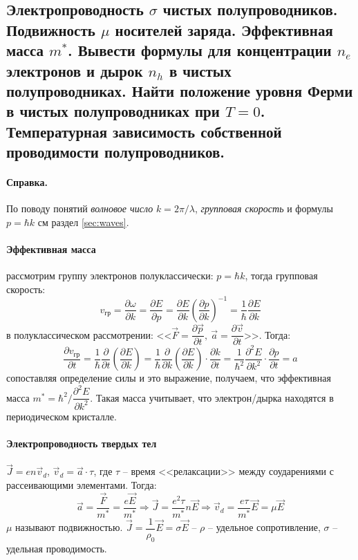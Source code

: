 \subsection{Электропроводность $\sigma$ чистых полупроводников. Подвижность $\mu$ носителей заряда.
Эффективная масса $m^*$. Вывести формулы для концентрации $n_e$ электронов и дырок $n_h$
в чистых полупроводниках. Найти положение уровня Ферми в чистых полупроводниках при $T=0$.
Температурная зависимость собственной проводимости полупроводников.}
{\footnotesize\paragraph{\footnotesize Справка.} По поводу понятий
  \emph{волновое число} $ k = 2\pi/\lambda $, \emph{групповая скорость} и формулы $ p = \hbar k
  $ см раздел \ref{sec:waves}.
}

\paragraph{Эффективная масса} рассмотрим группу электронов полуклассически: $p = \hbar k$, тогда
групповая скорость:
\[
  v_\text{гр} = \dfrac{\partial \omega}{\partial k} = \dfrac{\partial E}{\partial p} 
  = \dfrac{\partial E}{\partial k} \left( \dfrac{\partial p}{\partial k}  \right)^{-1}
  = \dfrac{1}{\hbar} \dfrac{\partial E}{\partial k} 
\]
в полуклассическом рассмотрении: <<$\vec{F} = \dfrac{\partial \vec{p}}{\partial
t},\
\vec{a} = \dfrac{\partial \vec{v}}{\partial t}$>>. Тогда:
\[
  \dfrac{\partial v_\text{гр}}{\partial t}
  = \dfrac{1}{\hbar} \dfrac{\partial }{\partial t} \left( \dfrac{\partial E}{\partial k} \right)
  = \dfrac{1}{\hbar} \dfrac{\partial }{\partial k} \left( \dfrac{\partial E}{\partial k}  \right) \cdot \dfrac{\partial k}{\partial t} 
  = \dfrac{1}{\hbar^2} \dfrac{\partial^2 E}{\partial k^2} \cdot \dfrac{\partial p}{\partial t}
  = a 
\]
сопоставляя определение силы и это выражение, получаем, что эффективная масса $m^* = \hbar^2 / \dfrac{\partial^2 E}{\partial k^2}$. Такая масса учитывает, что электрон/дырка
находятся в периодическом кристалле.

\paragraph{Электропроводность твердых тел} $\vec{J} = en \vec{v}_d$, $\vec{v}_d = \vec{a} \cdot \tau$, где $\tau$ -- время <<релаксации>> между соударениями с рассеивающими элементами. Тогда:
\begin{equation}\label{write:10:v_d}
  \vec{a} = \dfrac{\vec{F}}{m^*} = \dfrac{e\vec{E}}{m^*}
  \Rightarrow
  \vec{J} = \dfrac{e^2 \tau}{m^*} n \vec{E}
  \Rightarrow
  \vec{v}_d = \dfrac{e \tau}{m^*} \vec{E} = \mu \vec{E}
\end{equation}
$\mu$ называют подвижностью. $\vec{J} = \dfrac{1}{\rho_0} \vec{E} = \sigma \vec{E}$ -- $\rho$ --
удельное сопротивление, $\sigma$ -- удельная проводимость.

